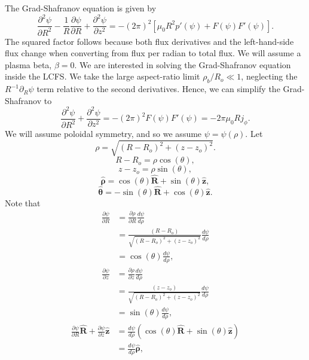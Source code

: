 \documentclass{article}
\begin{document}
The Grad-Shafranov equation is given by
\[\frac{\partial^2 \psi}{\partial R^2} - \frac{1}{R}\frac{\partial \psi}{\partial R} + \frac{\partial^2 \psi}{\partial z^2}
= -(2\pi)^2\left[\mu_0R^2p'(\psi)+F(\psi)F'(\psi)\right].\]
The squared factor follows because both flux derivatives and the left-hand-side flux
change when converting from flux per radian to total flux.
We will assume a plasma beta, $\beta=0$. We are interested in solving the Grad-Shafranov equation inside the LCFS. 
We take the large aspect-ratio limit $\rho_b/R_o\ll1$, neglecting the
$R^{-1}\partial_R\psi$ term relative to the second derivatives.
Hence, we can simplify the Grad-Shafranov to
\[\frac{\partial^2 \psi}{\partial R^2} + \frac{\partial^2 \psi}{\partial z^2}
= -(2\pi)^2F(\psi)F'(\psi)=-2\pi\mu_0Rj_\phi.\]
We will assume poloidal symmetry, and so we assume $\psi=\psi(\rho)$.
Let
\[\rho = \sqrt{(R-R_o)^2+(z-z_o)^2}.\]
\[R-R_o = \rho\cos(\theta),\]
\[z-z_o = \rho \sin(\theta),\]
\[\mathbf{\hat{\rho}} = \cos(\theta) \mathbf{\hat{R}} + \sin(\theta)\mathbf{\hat{z}},\]
\[\mathbf{\hat{\theta}} = -\sin(\theta) \mathbf{\hat{R}} + \cos(\theta)\mathbf{\hat{z}}.\]
Note that
\[\begin{aligned}
\frac{\partial \psi}{\partial R} &= \frac{\partial \rho}{\partial R}\frac{d \psi}{d \rho} \\
&= \frac{(R-R_o)}{\sqrt{(R-R_o)^2+(z-z_o)^2}}\frac{d \psi}{d \rho} \\
&= \cos(\theta)\frac{d \psi}{d \rho},
\end{aligned}\]
\[\begin{aligned}
\frac{\partial \psi}{\partial z} &= \frac{\partial \rho}{\partial z}\frac{d \psi}{d \rho} \\
&= \frac{(z-z_o)}{\sqrt{(R-R_o)^2+(z-z_o)^2}}\frac{d \psi}{d \rho} \\
&= \sin(\theta)\frac{d \psi}{d \rho},
\end{aligned}\]
\[\begin{aligned}
    \frac{\partial \psi}{\partial R}\mathbf{\hat{R}} + \frac{\partial \psi}{\partial z}\mathbf{\hat{z}} &= \frac{d \psi}{d \rho}(\cos(\theta) \mathbf{\hat{R}} + \sin(\theta)\mathbf{\hat{z}}) \\
    &= \frac{d \psi}{d \rho}\mathbf{\hat{\rho}},
\end{aligned}
\]
\end{document}
